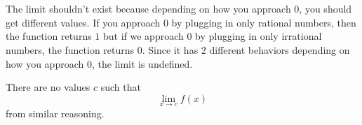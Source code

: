 \documentclass{article}
\begin{document}
\section{}
The limit shouldn't exist because depending on how you approach $0$, you should get different values. If you approach $0$ by plugging in only rational numbers, then the function returns \(1\) but if we approach $0$ by plugging in only irrational numbers, the function returns $0$. Since it has 2 different behaviors depending on how you approach $0$, the limit is undefined. 

There are no values \(c\) such that 
\[\lim_{x \to c} f(x)\] from similar reasoning. 
\end{document}
